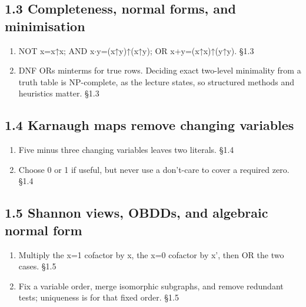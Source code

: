 \documentclass[11pt]{article}
\begin{document}
\begin{keepsection}\subsection{1.3 Completeness, normal forms, and minimisation}

\begin{enumerate}
\item NOT x=x↑x; AND x\ensuremath{\cdot}y=(x↑y)↑(x↑y); OR x+y=(x↑x)↑(y↑y). \hfill{\small\color{FAUblue}§1.3}
\item DNF ORs minterms for true rows. Deciding exact two-level minimality from a truth table is NP-complete, as the lecture states, so structured methods and heuristics matter. \hfill{\small\color{FAUblue}§1.3}
\end{enumerate}

\end{keepsection}
\begin{keepsection}\subsection{1.4 Karnaugh maps remove changing variables}

\begin{enumerate}
\item Five minus three changing variables leaves two literals. \hfill{\small\color{FAUblue}§1.4}
\item Choose 0 or 1 if useful, but never use a don’t-care to cover a required zero. \hfill{\small\color{FAUblue}§1.4}
\end{enumerate}

\end{keepsection}
\begin{keepsection}\subsection{1.5 Shannon views, OBDDs, and algebraic normal form}

\begin{enumerate}
\item Multiply the x=1 cofactor by x, the x=0 cofactor by x', then OR the two cases. \hfill{\small\color{FAUblue}§1.5}
\item Fix a variable order, merge isomorphic subgraphs, and remove redundant tests; uniqueness is for that fixed order. \hfill{\small\color{FAUblue}§1.5}
\end{enumerate}

\end{keepsection}
\end{document}
